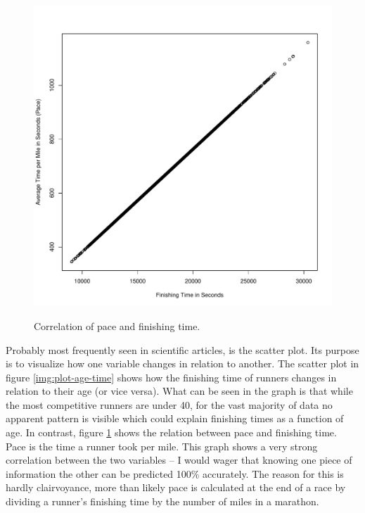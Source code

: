 \documentclass{tufte-book} %
\begin{document}
\begin{figure}
	\centering
	\includegraphics{graphics/plot-pace-time}
	\label{img:plot-pace-time}
	\caption{Correlation of pace and finishing time.}
\end{figure}

Probably most frequently seen in scientific articles, is the scatter plot. Its purpose is to visualize how one variable changes in relation to another. The scatter plot in figure \ref{img:plot-age-time} shows how the finishing time of runners changes in relation to their age (or vice versa). What can be seen in the graph is that while the most competitive runners are under 40, for the vast majority of data no apparent pattern is visible which could explain finishing times as a function of age. In contrast, figure \ref{img:plot-pace-time} shows the relation between pace and finishing time. Pace is the time a runner took per mile. This graph shows a very strong correlation between the two variables -- I would wager that knowing one piece of information the other can be predicted 100\% accurately. The reason for this is hardly clairvoyance, more than likely pace is calculated at the end of a race by dividing a runner's finishing time by the number of miles in a marathon.
\end{document}
